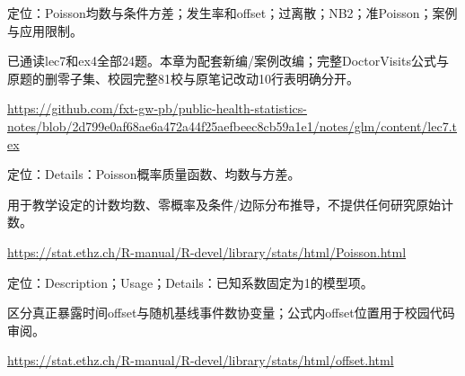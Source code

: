 \par\noindent\begin{minipage}{\linewidth}\raggedright{}\label{src:G7-NOTE}
\par
定位：Poisson均数与条件方差；发生率和offset；过离散；NB2；准Poisson；案例与应用限制。\par
已通读lec7和ex4全部24题。本章为配套新编/案例改编；完整DoctorVisits公式与原题的删零子集、校园完整81校与原笔记改动10行表明确分开。\par
{\small \url{https://github.com/fxt-gw-pb/public-health-statistics-notes/blob/2d799e0af68ae6a472a44f25aefbeec8cb59a1e1/notes/glm/content/lec7.tex}}\par
\end{minipage}\par\medskip

\par\noindent\begin{minipage}{\linewidth}\raggedright{}\label{src:G7-R-POISSON}
\par
定位：Details：Poisson概率质量函数、均数与方差。\par
用于教学设定的计数均数、零概率及条件/边际分布推导，不提供任何研究原始计数。\par
{\small \url{https://stat.ethz.ch/R-manual/R-devel/library/stats/html/Poisson.html}}\par
\end{minipage}\par\medskip

\par\noindent\begin{minipage}{\linewidth}\raggedright{}\label{src:G7-R-OFFSET}
\par
定位：Description；Usage；Details：已知系数固定为1的模型项。\par
区分真正暴露时间offset与随机基线事件数协变量；公式内offset位置用于校园代码审阅。\par
{\small \url{https://stat.ethz.ch/R-manual/R-devel/library/stats/html/offset.html}}\par
\end{minipage}\par\medskip

